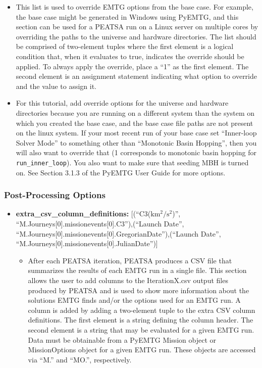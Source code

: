 \documentclass[11pt]{article}
\begin{document}
\begin{itemize}
	\begin{itemize}
		\item This list is used to override \ac{EMTG} options from the base case. For example, the base case might be generated in Windows using PyEMTG, and this section can be used for a \ac{PEATSA} run on a Linux server on multiple cores by overriding the paths to the universe and hardware directories. The list should be comprised of two-element tuples where the first element is a logical condition that, when it evaluates to true, indicates the override should be applied. To always apply the override, place a ``1'' as the first element. The second element is an assignment statement indicating what option to override and the value to assign it.
		\item For this tutorial, add override options for the universe and hardware directories because you are running on a different system than the system on which you created the base case, and the base case file paths are not present on the linux system. If your most recent run of your base case set ``Inner-loop Solver Mode'' to something other than ``Monotonic Basin Hopping'', then you will also want to override that (1 corresponds to monotonic basin hopping for \texttt{run\_inner\_loop}). You also want to make sure that seeding \acs{MBH} is turned on. See Section 3.1.3 of the PyEMTG User Guide for more options.
	\end{itemize}
\end{itemize}

\subsubsection{Post-Processing Options}
\label{sec:post_processing_options}

\begin{itemize}
	\item\textbf{extra\_csv\_column\_definitions:} [(``C3(\(\mathrm{km^2/s^2}\))'', ``M.Journeys[0].missionevents[0].C3''),\newline (``Launch Date'', ``M.Journeys[0].missionevents[0].GregorianDate''),\newline (``Launch Date'', ``M.Journeys[0].missionevents[0].JulianDate'')]
	\begin{itemize}
		\item After each \ac{PEATSA} iteration, \ac{PEATSA} produces a CSV file that summarizes the results of each \ac{EMTG} run in a single file. This section allows the user to add columns to the IterationX.csv output files produced by \ac{PEATSA} and is used to show more information about the solutions \ac{EMTG} finds and/or the options used for an \ac{EMTG} run. A column is added by adding a two-element tuple to the extra CSV column definitions. The first element is a string defining the column header. The second element is a string that may be evaluated for a given \ac{EMTG} run. Data must be obtainable from a PyEMTG Mission object or MissionOptions object for a given \ac{EMTG} run. These objects are accessed via ``M.'' and ``MO.'', respectively.
	\end{itemize}
\end{itemize}
\end{document}
